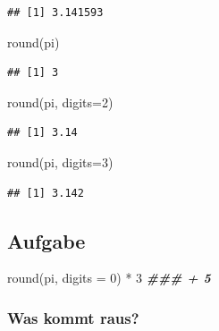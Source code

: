 \documentclass[
]{book}
\newenvironment{Shaded}{\begin{snugshade}}{\end{snugshade}}
\newcommand{\AttributeTok}[1]{\textcolor[rgb]{0.77,0.63,0.00}{#1}}
\newcommand{\DecValTok}[1]{\textcolor[rgb]{0.00,0.00,0.81}{#1}}
\newcommand{\DocumentationTok}[1]{\textcolor[rgb]{0.56,0.35,0.01}{\textbf{\textit{#1}}}}
\newcommand{\FunctionTok}[1]{\textcolor[rgb]{0.00,0.00,0.00}{#1}}
\newcommand{\NormalTok}[1]{#1}
\newcommand{\SpecialCharTok}[1]{\textcolor[rgb]{0.00,0.00,0.00}{#1}}
\begin{document}
\begin{verbatim}
## [1] 3.141593
\end{verbatim}

\begin{Shaded}
\begin{Highlighting}[]
\FunctionTok{round}\NormalTok{(pi)}
\end{Highlighting}
\end{Shaded}

\begin{verbatim}
## [1] 3
\end{verbatim}

\begin{Shaded}
\begin{Highlighting}[]
\FunctionTok{round}\NormalTok{(pi, }\AttributeTok{digits=}\DecValTok{2}\NormalTok{)}
\end{Highlighting}
\end{Shaded}

\begin{verbatim}
## [1] 3.14
\end{verbatim}

\begin{Shaded}
\begin{Highlighting}[]
\FunctionTok{round}\NormalTok{(pi, }\AttributeTok{digits=}\DecValTok{3}\NormalTok{)}
\end{Highlighting}
\end{Shaded}

\begin{verbatim}
## [1] 3.142
\end{verbatim}

\hypertarget{aufgabe}{%
\subsection*{Aufgabe}\label{aufgabe}}

\begin{Shaded}
\begin{Highlighting}[]
\FunctionTok{round}\NormalTok{(pi, }\AttributeTok{digits =} \DecValTok{0}\NormalTok{) }\SpecialCharTok{*} \DecValTok{3} \DocumentationTok{\#\#\# + 5}
\end{Highlighting}
\end{Shaded}

\hypertarget{was-kommt-raus}{%
\subsubsection*{Was kommt raus?}\label{was-kommt-raus}}
\end{document}
